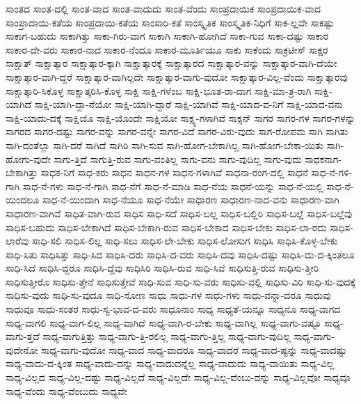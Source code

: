 {ಸಾಂತದ
ಸಾಂತ-ದಲ್ಲಿ
ಸಾಂತ-ವಾದ
ಸಾಂತ-ವಾದುದು
ಸಾಂತ-ವೆಂದು
ಸಾಂಪ್ರದಾಯಿಕ
ಸಾಂಪ್ರದಾಯಿಕ-ವಾದ
ಸಾಂಪ್ರಾದಾಯಿ-ಕತೆಯ
ಸಾಂಪ್ರದಾಯಿ-ಕತೆಯ
ಸಾಂಸಾರಿ-ಕತೆ
ಸಾಂಸ್ಕೃತಿಕ
ಸಾಂಸ್ಕೃತಿಕ-ನಿಧಿಗೆ
ಸಾಕ-ಲ್ಲವೇ
ಸಾಕಷ್ಟು
ಸಾಕಾಗ-ಬಹುದು
ಸಾಕಾಗಿತ್ತು
ಸಾಕಾ-ಗಿರು-ವಾಗ
ಸಾಕಾಗಿ
ಸಾಕಾಗಿ-ಹೋಗಿದೆ
ಸಾಕಾ-ಗುವ
ಸಾಕಾ-ದಷ್ಟು
ಸಾಕಾರ
ಸಾಕಾರ-ದೇ-ವರು
ಸಾಕಾರ-ನಾದ
ಸಾಕಾರ-ನೆಂದೂ
ಸಾಕಾರ-ಮೂರ್ತಿಯೂ
ಸಾಕು
ಸಾಕೆಂದು
ಸಾಕ್ರಟೀಸ್
ಸಾಕ್ಷರ
ಸಾಕ್ಷಾತ್
ಸಾಕ್ಷಾತ್ಕಾರ
ಸಾಕ್ಷಾತ್ಕಾರ-ಕ್ಕಾಗಿ
ಸಾಕ್ಷಾತ್ಕಾರಕ್ಕೆ
ಸಾಕ್ಷಾತ್ಕಾರದ
ಸಾಕ್ಷಾತ್ಕಾರ-ವನ್ನು
ಸಾಕ್ಷಾತ್ಕಾರ-ವಾಗಿ-ದೆಯೇ
ಸಾಕ್ಷಾತ್ಕಾರ-ವಾಗಿ-ದ್ದರೆ
ಸಾಕ್ಷಾತ್ಕಾರ-ವಾಗಿಲ್ಲದೇ
ಸಾಕ್ಷಾತ್ಕಾರ-ವಾಗು-ವುದೋ
ಸಾಕ್ಷಾತ್ಕಾರ-ವಿಲ್ಲ-ವೆಂದು
ಸಾಕ್ಷಾತ್ಕಾರವು
ಸಾಕ್ಷಾತ್ಕಾರಿ-ಸಿಕೊಳ್ಳ
ಸಾಕ್ಷಾತ್ಕರಿಸಿ-ಕೊಳ್ಳ
ಸಾಕ್ಷಿ
ಸಾಕ್ಷಿ-ಗಳೆಂಬ
ಸಾಕ್ಷಿ-ಭೂತ-ರಾ-ದಾಗ
ಸಾಕ್ಷಿ-ಮಾ-ತ್ರ-ರಾಗಿ
ಸಾಕ್ಷಿ-ಯಾಗಿದೆ
ಸಾಕ್ಷಿ-ಯಾಗಿ-ದ್ದಾ-ನೆಯೋ
ಸಾಕ್ಷಿ-ಯಾಗಿ-ದ್ದಾರೆ
ಸಾಕ್ಷಿ-ಯಾಗಿವೆ
ಸಾಕ್ಷಿ-ಯಾದ-ವ-ನಿಗೆ
ಸಾಕ್ಷಿ-ಯಾದ-ವನು
ಸಾಕ್ಷಿ-ಯಾದು-ದಕ್ಕೆ
ಸಾಕ್ಷಿಯೊ
ಸಾಕ್ಷಿ-ಯೊಂದೇ
ಸಾಕ್ಷಿಯೋ
ಸಾಕ್ಷ್ಯ-ಗಳಾಗಿವೆ
ಸಾಕ್ಸನ್
ಸಾಗರ
ಸಾಗರ-ಗಳ
ಸಾಗರ-ಗಳನ್ನು
ಸಾಗರದ
ಸಾಗರ-ದಷ್ಟು
ಸಾಗರ-ವನ್ನು
ಸಾಗರ-ವನ್ನೇ
ಸಾಗರ-ವಿದೆ
ಸಾಗರ-ವಿರು-ವುದು
ಸಾಗ-ರೋಪಮ
ಸಾಗಿ
ಸಾಗಿತು
ಸಾಗಿ-ದಂತೆಲ್ಲಾ
ಸಾಗಿ-ದರೆ
ಸಾಗಿದೆ
ಸಾಗಿರಿ
ಸಾಗಿ-ಸುವ
ಸಾಗಿ-ಹೋಗ-ಬೇಕಾಗಿಲ್ಲ
ಸಾಗಿ-ಹೋಗ-ಬೇಕಾ-ಯಿತು
ಸಾಗಿ-ಹೋಗು-ವುದೇ
ಸಾಗು-ತ್ತಿದೆ
ಸಾಗುತ್ತಿ-ರುವ
ಸಾಗು-ವಂತಿಲ್ಲ
ಸಾಗು-ವನು
ಸಾಗು-ವುದಿಲ್ಲ
ಸಾಗು-ವುದು
ಸಾಧಕನಾಗ-ಬೇಕಾಗಿತ್ತು
ಸಾಧಕ-ನಿಗೆ
ಸಾಧ-ಕರು
ಸಾಧನ
ಸಾಧನ-ಗಳ
ಸಾಧನ-ಗಳಾಗಿವೆ
ಸಾಧನಾ-ರಂಗ-ದಲ್ಲಿ
ಸಾಧನೆ
ಸಾಧ-ನೆ-ಗಳಿ-ಗಾಗಿ
ಸಾಧ-ನೆ-ಗಳು
ಸಾಧ-ನೆ-ಗಾಗಿ
ಸಾಧ-ನೆಗೆ
ಸಾಧ-ನೆ-ಮಾಡಿ
ಸಾಧ-ನೆಯ
ಸಾಧನೆ-ಯನ್ನು
ಸಾಧ-ನೆ-ಯಲ್ಲಿ
ಸಾಧ-ನೆ-ಯಿಂದಲೂ
ಸಾಧ-ನೆ-ಯಿಂದಾಗಿ
ಸಾಧ-ನೆಯೂ
ಸಾಧ-ನೆಯೇ
ಸಾಧಾರಣ
ಸಾಧಾರಣ-ನಾದ-ವನು
ಸಾಧಾರಣ-ವಾಗಿ
ಸಾಧಾರಣ-ವಾಗಿವೆ
ಸಾಧಿತ-ವಾಗಿ-ರುವ
ಸಾಧಿಸ
ಸಾಧಿ-ಸದೆ
ಸಾಧಿಸ-ಬಲ್ಲ
ಸಾಧಿಸ-ಬಲ್ಲಿರಿ
ಸಾಧಿಸ-ಬಲ್ಲೆ
ಸಾಧಿಸ-ಬಲ್ಲೆವು
ಸಾಧಿಸ-ಬಹುದು
ಸಾಧಿಸ-ಬೇಕಾಗಿದೆ
ಸಾಧಿಸ-ಬೇಕಾಗಿ-ರುವ
ಸಾಧಿಸ-ಬೇಕಾದ
ಸಾಧಿಸ-ಬೇಕು
ಸಾಧಿಸ-ಲಾ-ರದು
ಸಾಧಿಸ-ಲಾರೆವು
ಸಾಧಿ-ಸಲಿ
ಸಾಧಿಸ-ಲಿಲ್ಲ
ಸಾಧಿ-ಸಲು
ಸಾಧಿಸ-ಲೇ-ಬೇಕು
ಸಾಧಿಸ-ಲೋಸುಗ
ಸಾಧಿಸಿ
ಸಾಧಿಸಿ-ಕೊಳ್ಳ-ಬೇಕು
ಸಾಧಿ-ಸಿತು
ಸಾಧಿಸಿತ್ತು
ಸಾಧಿ-ಸಿದ
ಸಾಧಿಸಿ-ದರು
ಸಾಧಿಸಿ-ದ-ವರು
ಸಾಧಿಸಿ-ದವು
ಸಾಧಿಸಿ-ದಷ್ಟು
ಸಾಧಿಸಿ-ದು-ದ-ಕ್ಕಿಂತಲೂ
ಸಾಧಿ-ಸಿದೆ
ಸಾಧಿಸಿ-ದ್ದರೂ
ಸಾಧಿಸಿ-ದ್ದೆವು
ಸಾಧಿಸಿರಿ
ಸಾಧಿಸಿ-ರುವ
ಸಾಧಿ-ಸಿವೆ
ಸಾಧಿಸುತ್ತಿ-ರುವ
ಸಾಧಿಸು-ತ್ತೀರಿ
ಸಾಧಿಸುತ್ತೀರೊ
ಸಾಧಿಸು-ತ್ತೇನೆ
ಸಾಧಿಸುತ್ತೇವೆ
ಸಾಧಿ-ಸುವ
ಸಾಧಿ-ಸು-ವರು
ಸಾಧಿಸು-ವಲ್ಲಿ
ಸಾಧಿಸು-ವಿರಿ
ಸಾಧಿ-ಸು-ವುದಕ್ಕೆ
ಸಾಧಿಸು-ವುದು
ಸಾಧಿ-ಸು-ವುದೂ
ಸಾಧಿ-ಸೋಣ
ಸಾಧು
ಸಾಧು-ಗಳ
ಸಾಧು-ಗಳು
ಸಾಧು-ವನ್ನಾ-ದರೂ
ಸಾಧುವು
ಸಾಧುವೂ
ಸಾಧು-ಸಂತರ
ಸಾಧು-ಸ್ವ-ಭಾವ-ದ-ವರು
ಸಾಧೂನಾಂ
ಸಾಧ್ಯ
ಸಾಧ್ಯತೆ-ಯನ್ನೂ
ಸಾಧ್ಯನೂ
ಸಾಧ್ಯ-ವಾಗದ
ಸಾಧ್ಯ-ವಾಗಲಿ
ಸಾಧ್ಯ-ವಾಗ-ಲಿಲ್ಲ
ಸಾಧ್ಯ-ವಾಗಿದೆ
ಸಾಧ್ಯ-ವಾಗಿ-ರ-ಬೇಕು
ಸಾಧ್ಯ-ವಾಗಿಲ್ಲ
ಸಾಧ್ಯ-ವಾಗು-ವಷ್ಟೂ
ಸಾಧ್ಯ-ವಾಗು-ತ್ತದೆ
ಸಾಧ್ಯ-ವಾಗುತ್ತಿತ್ತು
ಸಾಧ್ಯ-ವಾಗು-ತ್ತಿ-ರಲಿಲ್ಲ
ಸಾಧ್ಯ-ವಾಗು-ತ್ತಿಲ್ಲ
ಸಾಧ್ಯ-ವಾಗು-ವುದಿಲ್ಲ
ಸಾಧ್ಯ-ವಾಗು-ವುದೇನೋ
ಸಾಧ್ಯ-ವಾಗು-ವುದೋ
ಸಾಧ್ಯ-ವಾದ
ಸಾಧ್ಯ-ವಾದರೂ
ಸಾಧ್ಯ-ವಾದರೆ
ಸಾಧ್ಯ-ವಾದ-ಷ್ಟನ್ನು
ಸಾಧ್ಯ-ವಾದಷ್ಟು
ಸಾಧ್ಯ-ವಾದು-ದ-ಕ್ಕಿಂತ
ಸಾಧ್ಯ-ವಾದು-ದನ್ನು
ಸಾಧ್ಯ-ವಾದುದನ್ನೆಲ್ಲ
ಸಾಧ್ಯ-ವಾದುದು
ಸಾಧ್ಯ-ವಾಯಿತು
ಸಾಧ್ಯ-ವಿಲ್ಲ
ಸಾಧ್ಯ-ವಿಲ್ಲದ
ಸಾಧ್ಯ-ವಿಲ್ಲ-ದಷ್ಟು
ಸಾಧ್ಯ-ವಿಲ್ಲದೆ
ಸಾಧ್ಯ-ವಿಲ್ಲದೇ
ಸಾಧ್ಯ-ವಿಲ್ಲ-ವೆಂಬು-ದನ್ನು
ಸಾಧ್ಯ-ವಿಲ್ಲವೋ
ಸಾಧ್ಯವೂ
ಸಾಧ್ಯ-ವೆಂದು
ಸಾಧ್ಯ-ವೆಂಬುದು
ಸಾಧ್ಯವೇ
}
